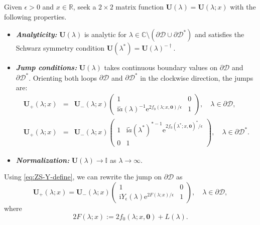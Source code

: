 \documentclass[12pt]{amsart}
\numberwithin{equation}{section}
\newcommand{\ee}{\mathrm{e}}
\newcommand{\ii}{\mathrm{i}}
\newcommand{\SP}{\lambda}
\begin{document}
\begin{myrhp}[Problem for $\mathbf{t}=\mathbf{0}$ and $x>X_+$]
Given $\epsilon>0$ and $x \in\mathbb{R}$, seek a $2\times 2$ matrix function 
$\mathbf{U}(\SP)=\mathbf{U}(\SP;x)$ with the following properties.
\begin{itemize}
\item[]\textit{\textbf{Analyticity:}}  $\mathbf{U}(\SP)$ is analytic for 
$\SP\in\mathbb{C}\setminus(\partial\mathscr{D}\cup\partial\mathscr{D}^*)$ 
and satisfies the Schwarz symmetry condition 
$\mathbf{U}(\SP^*)=\mathbf{U}(\SP)^{-\dagger}$.
\item[]\textit{\textbf{Jump conditions:}} $\mathbf{U}(\SP)$ takes continuous 
boundary values on $\partial\mathscr{D}$ and $\partial\mathscr{D}^*$.  
Orienting both loops $\partial\mathscr{D}$ and $\partial\mathscr{D}^*$ 
in the clockwise direction, the jumps are:
\begin{eqnarray}
\mathbf{U}_+(\SP;x) & = & \mathbf{U}_-(\SP;x)\begin{pmatrix}1 & 0\\
\ii \widetilde{a}(\SP)^{-1}\ee^{2f_0(\SP;x,\mathbf{0})/\epsilon} & 1
\end{pmatrix},\quad \SP\in\partial\mathscr{D}, \\
\mathbf{U}_+(\SP;x) & = & \mathbf{U}_-(\SP;x)\begin{pmatrix}1 & \ii \widetilde{a}(\SP^*)^{*-1}\ee^{2f_0(\SP^*; x,\mathbf{0})^*/\epsilon}\\0 & 1\end{pmatrix},\quad\SP\in\partial\mathscr{D}^*.
\end{eqnarray}
\item[]\textit{\textbf{Normalization:}} $\mathbf{U}(\SP)\to\mathbb{I}$ as $\SP\to\infty$.
\end{itemize}
\label{rhp:U}
\end{myrhp}
Using \eqref{eq:ZS-Y-define}, we can rewrite the jump on $\partial\mathscr{D}$ as
\begin{equation}
\mathbf{U}_+(\SP;x) = \mathbf{U}_-(\SP;x)\begin{pmatrix}1 & 0\\
\ii Y_\epsilon(\lambda)\ee^{2F(\SP;x)/\epsilon} & 1
\end{pmatrix},\quad \SP\in\partial\mathscr{D},
\label{U-on-Dboundary}
\end{equation}
where
\begin{equation}
2F(\lambda;x):=2f_0(\lambda;x,\mathbf{0})+L(\lambda).
\label{2F-of-lambda}
\end{equation}
\end{document}
